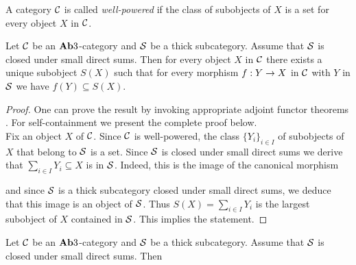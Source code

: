 \begin{definition}
A category ${\mathcal C}$ is called \textit{well-powered} if the class of subobjects of $X$ is a set for every object $X$ in ${\mathcal C}$.
\end{definition}

\begin{proposition}\label{proposition:largest_subobject_in_thick_subcategory}
Let ${\mathcal C}$ be an $\mathbf{Ab}3$-category and ${\mathcal S}$ be a thick subcategory. Assume that ${\mathcal S}$ is closed under small direct sums. Then for every object $X$ in ${\mathcal C}$ there exists a unique subobject $S(X)$ such that for every morphism $f:Y\rightarrow X$ in ${\mathcal C}$ with $Y$ in ${\mathcal S}$ we have $f(Y)\subseteq S(X)$.
\end{proposition}
\begin{proof}
One can prove the result by invoking appropriate adjoint functor theorems {\cite[Chapter V, Sections 5 and 6]{Maclane}}. For self-containment we present the complete proof below.\\
Fix an object $X$ of ${\mathcal C}$. Since ${\mathcal C}$ is well-powered, the class $\{Y_i\}_{i\in I}$ of subobjects of $X$ that belong to ${\mathcal S}$ is a set. Since ${\mathcal S}$ is closed under small direct sums we derive that $\sum_{i\in I}Y_i\subseteq X$ is in ${\mathcal S}$. Indeed, this is the image of the canonical morphism
\begin{center}
\end{center}
and since ${\mathcal S}$ is a thick subcategory closed under small direct sums, we deduce that this image is an object of ${\mathcal S}$. Thus $S(X) = \sum_{i\in I}Y_i$ is the largest subobject of $X$ contained in ${\mathcal S}$. This implies the statement.
\end{proof}

\begin{definition}
Let ${\mathcal C}$ be an $\mathbf{Ab}3$-category and ${\mathcal S}$ be a thick subcategory. Assume that ${\mathcal S}$ is closed under small direct sums. Then 
\end{definition}


\small




